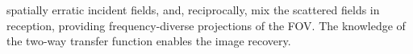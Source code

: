 spatially erratic incident fields, and, reciprocally, mix
the scattered fields in
reception, providing
frequency-diverse projections of
the \ac{FOV}.
The knowledge of
the two-way transfer function enables
the image recovery.
